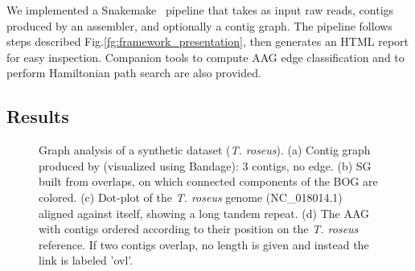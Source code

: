 \documentclass[./main.tex]{subfiles}
\newcommand{\modafterreview}[1]{#1}
\begin{document}
We implemented a Snakemake~\citep{snakemake} pipeline that takes as input \modafterreview{raw reads, contigs produced by an assembler, and optionally a contig graph. The pipeline follows steps described Fig.\ref{fg:framework_presentation}}, then generates an HTML report for easy inspection.
\modafterreview{Companion tools to compute AAG edge classification and to perform Hamiltonian path search are also provided.}

\subsection{Results}

\begin{figure}[!htbp]
\centering
{}

\modafterreview{
\subfloat[] {
	
   \label{fg:t_roseus_reconstruction}
}}

\caption{ 
Graph analysis of a synthetic dataset (\textsl{T. roseus}).
%
(a) Contig graph produced by \canu (visualized using Bandage): 3 contigs, no edge. 
%
(b) SG built from \minimap overlaps, on which  connected components of the \canu BOG are colored. 
% 
(c) Dot-plot of the \textsl{T. roseus} genome (NC\_018014.1) aligned against itself, showing a long tandem repeat.
%
(d) The AAG with \canu contigs ordered according to their position on the \textsl{T. roseus} reference. If two contigs overlap, no length is given and instead the link is labeled ’ovl’.
}
\end{figure}
\end{document}
